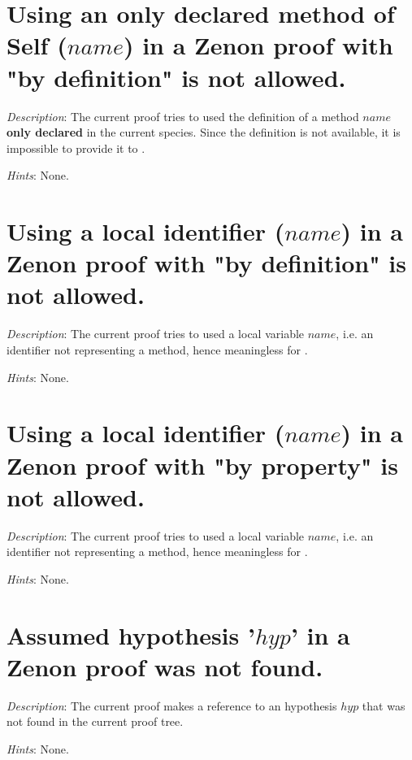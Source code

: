 \section*{Using an only declared method of Self ($name$) in a Zenon
  proof with "by definition" is not allowed.}

{\em Description}: The current proof tries to used the definition of a
method $name$ {\bf only declared} in the current species. Since the
definition is not available, it is impossible to provide it to
\zenon.

{\em Hints}: None.



\section*{Using a local identifier ($name$) in a Zenon proof with "by
  definition" is not allowed.}

{\em Description}: The current proof tries to used a local variable
$name$, i.e. an identifier not representing a method, hence
meaningless for \zenon.

{\em Hints}: None.



\section*{Using a local identifier ($name$) in a Zenon proof with "by
  property" is not allowed.}

{\em Description}: The current proof tries to used a local variable
$name$, i.e. an identifier not representing a method, hence
meaningless for \zenon.

{\em Hints}: None.



\section*{Assumed hypothesis '$hyp$' in a Zenon proof was not found.}

{\em Description}: The current proof makes a reference to an
hypothesis $hyp$ that was not found in the current proof tree.

{\em Hints}: None.



